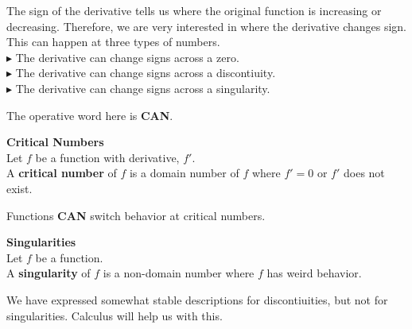 \documentclass{ximera}
\begin{document}
The sign of the derivative tells us where the original function is increasing or decreasing.  Therefore, we are very interested in where the derivative changes sign.\\

This can happen at three types of numbers. \\


\textbf{\textcolor{red!90!darkgray}{$\blacktriangleright$}} The derivative can change signs across a zero. \\


\textbf{\textcolor{red!90!darkgray}{$\blacktriangleright$}} The derivative can change signs across a discontiuity. \\


\textbf{\textcolor{red!90!darkgray}{$\blacktriangleright$}}  The derivative can change signs across a singularity. \\



\begin{center}
The operative word here is \textbf{\textcolor{red!80!black}{CAN}}.
\end{center}




\begin{template}  \textbf{\textcolor{blue!55!black}{Critical Numbers}}  \\

Let $f$ be a function with derivative, $f'$. \\


A \textbf{\textcolor{green!50!black}{critical number}} of $f$ is a domain number of $f$ where $f' = 0$ or $f'$ does not exist.


\end{template}

Functions \textbf{\textcolor{red!80!black}{CAN}} switch behavior at critical numbers. \\








\begin{template}  \textbf{\textcolor{blue!55!black}{Singularities}}  \\

Let $f$ be a function. \\

A \textbf{\textcolor{green!50!black}{singularity}} of $f$ is a non-domain number where $f$ has weird behavior.



\begin{explanation}

We have expressed somewhat stable descriptions for discontiuities, but not for singularities.  Calculus will help us with this.
\end{explanation}


\end{template}
\end{document}
